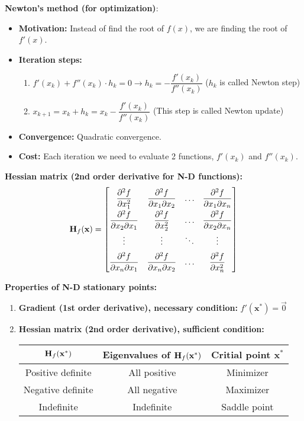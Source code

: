 \documentclass[12pt]{article}
\begin{document}
\medskip
\noindent \textbf{Newton's method (for optimization)}:
    \begin{itemize}
        \item \textbf{Motivation:} Instead of find the root of $f(x)$, we are finding the root of $f'(x)$.
        \item \textbf{Iteration steps:} 
        \begin{enumerate}
            \item $f'(x_k) + f''(x_k)\cdot h_k = 0 \to h_k = -\dfrac{f'(x_k)}{f''(x_k)}$ ($h_k$ is called Newton step)
            \item $x_{k+1} = x_k + h_k = x_k - \dfrac{f'(x_k)}{f''(x_k)}$ (This step is called Newton update)
        \end{enumerate}
        \item \textbf{Convergence:} Quadratic convergence.
        \item \textbf{Cost:} Each iteration we need to evaluate 2 functions, $f'(x_k)$ and $f''(x_k)$.
    \end{itemize}

\medskip
\noindent \textbf{Hessian matrix (2nd order derivative for N-D functions): }
$${\bf H}_f(\mathbf{x}) =\renewcommand\arraystretch{2} \begin{bmatrix} \dfrac{\partial^2 f}{\partial x_1^2} & \dfrac{\partial^2 f}{\partial x_1 \partial x_2} & \ldots & \dfrac{\partial^2 f}{\partial x_1 \partial x_n} \\ \dfrac{\partial^2 f}{\partial x_2 \partial x_1} & \dfrac{\partial^2 f}{\partial x_2^2} & \ldots & \dfrac{\partial^2 f}{\partial x_2 \partial x_n} \\ \vdots & \vdots & \ddots & \vdots \\ \dfrac{\partial^2 f}{\partial x_n \partial x_1} & \dfrac{\partial^2 f}{\partial x_n \partial x_2} & \ldots & \dfrac{\partial^2 f}{\partial x_n^2} \end{bmatrix}$$

\newpage
\noindent \textbf{Properties of N-D stationary points:}
    \begin{enumerate}
        \item \textbf{Gradient (1st order derivative), necessary condition:} $f'(\mathbf{x}^*) = \Vec{0}$
        \item \textbf{Hessian matrix (2nd order derivative), sufficient condition:}
\begin{center}
        \begin{tabular}{ | c | c | c | } 
              \hline
              ${\bf H}_f(\mathbf{x}^*)$ & \textbf{Eigenvalues of ${\bf H}_f(\mathbf{x}^*)$} & \textbf{Critial point $\mathbf{x}^*$} \\ 
              \hline
              Positive definite & All positive & Minimizer \\ 
              \hline
              Negative definite & All negative & Maximizer\\ 
              \hline
              Indefinite & Indefinite & Saddle point \\ 
              \hline
        \end{tabular}
    \end{center}
    \end{enumerate}
\end{document}
